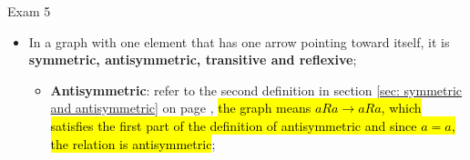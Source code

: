 \documentclass{note}
\begin{document}
\begin{note}{Exam 5}
\begin{itemize}
            \item In a graph with one element that has one arrow pointing toward itself, it is \textbf{symmetric, antisymmetric,
            transitive and reflexive};
            \begin{itemize}
                \item \textbf{Antisymmetric}: refer to the second definition in section \ref{sec: symmetric and antisymmetric} on page
                \pageref{sec: symmetric and antisymmetric}, \hl{the graph means $ a R a \to a R a $, which satisfies the first part
                of the definition of antisymmetric and since $ a =  a $, the relation is antisymmetric};
            \end{itemize}
        \end{itemize}


    \end{note}
\end{document}
